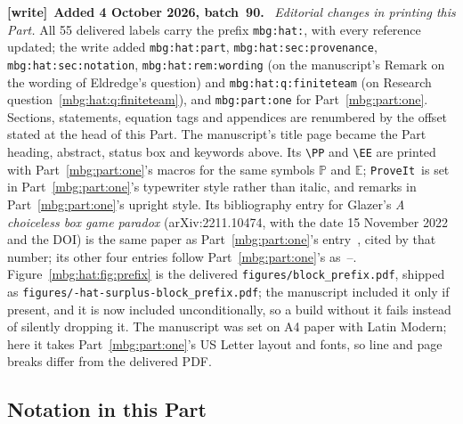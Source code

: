 \documentclass[11pt,letterpaper]{article}
\theoremstyle{definition}
\newcommand{\E}{\mathbb E}
\newcommand{\Prb}{\mathbb P}
\newcommand{\repo}{\texttt{ProveIt}}
\newenvironment{writenote}[1][]{\par\smallskip\begingroup\small
 \noindent\textbf{[write]}\if\relax\detokenize{#1}\relax\else~\textbf{#1.}\fi\ }%
 {\par\endgroup\smallskip}
\begin{document}
\begin{writenote}[Added 4 October 2026, batch~90]
\emph{Editorial changes in printing this Part.} All 55 delivered labels carry the prefix \texttt{mbg:hat:}, with every reference updated; the write added \texttt{mbg:hat:part}, \texttt{mbg:hat:sec:provenance}, \texttt{mbg:hat:sec:notation}, \texttt{mbg:hat:rem:wording} (on the manuscript's Remark on the wording of Eldredge's question) and \texttt{mbg:hat:q:finiteteam} (on Research question~\ref{mbg:hat:q:finiteteam}), and \texttt{mbg:part:one} for Part~\ref{mbg:part:one}. Sections, statements, equation tags and appendices are renumbered by the offset stated at the head of this Part. The manuscript's title page became the Part heading, abstract, status box and keywords above. Its \texttt{\textbackslash PP} and \texttt{\textbackslash EE} are printed with Part~\ref{mbg:part:one}'s macros for the same symbols $\Prb$ and $\E$; \repo\ is set in Part~\ref{mbg:part:one}'s typewriter style rather than italic, and remarks in Part~\ref{mbg:part:one}'s upright style. Its bibliography entry for Glazer's \emph{A choiceless box game paradox} (arXiv:2211.10474, with the date 15 November 2022 and the DOI) is the same paper as Part~\ref{mbg:part:one}'s entry~\cite{GlazerBox}, cited by that number; its other four entries follow Part~\ref{mbg:part:one}'s as~\cite{hat:Eldredge}--\cite{hat:ProveItCoding}. Figure~\ref{mbg:hat:fig:prefix} is the delivered \texttt{figures/\allowbreak block\_\allowbreak prefix.pdf}, shipped as \texttt{figures/-hat-surplus-\allowbreak block\_\allowbreak prefix.pdf}; the manuscript included it only if present, and it is now included unconditionally, so a build without it fails instead of silently dropping it. The manuscript was set on A4 paper with Latin Modern; here it takes Part~\ref{mbg:part:one}'s US Letter layout and fonts, so line and page breaks differ from the delivered PDF.
\end{writenote}

\subsection{Notation in this Part}
\label{mbg:hat:sec:notation}
\end{document}
